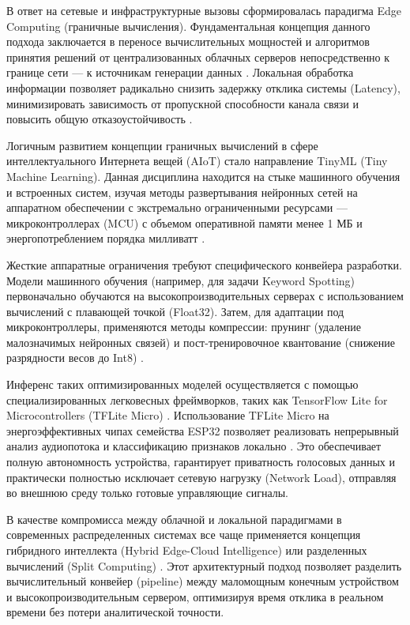 В ответ на сетевые и инфраструктурные вызовы сформировалась парадигма Edge Computing (граничные вычисления). Фундаментальная концепция данного подхода заключается в переносе вычислительных мощностей и алгоритмов принятия решений от централизованных облачных серверов непосредственно к границе сети — к источникам генерации данных \cite{Hazra2024}. Локальная обработка информации позволяет радикально снизить задержку отклика системы (Latency), минимизировать зависимость от пропускной способности канала связи и повысить общую отказоустойчивость \cite{Satyanarayanan2017}.

Логичным развитием концепции граничных вычислений в сфере интеллектуального Интернета вещей (AIoT) стало направление TinyML (Tiny Machine Learning). Данная дисциплина находится на стыке машинного обучения и встроенных систем, изучая методы развертывания нейронных сетей на аппаратном обеспечении с экстремально ограниченными ресурсами — микроконтроллерах (MCU) с объемом оперативной памяти менее 1 МБ и энергопотреблением порядка милливатт \cite{warden2019tinyml, Ray2022}. 

Жесткие аппаратные ограничения требуют специфического конвейера разработки. Модели машинного обучения (например, для задачи Keyword Spotting) первоначально обучаются на высокопроизводительных серверах с использованием вычислений с плавающей точкой (Float32). Затем, для адаптации под микроконтроллеры, применяются методы компрессии: прунинг (удаление малозначимых нейронных связей) и пост-тренировочное квантование (снижение разрядности весов до Int8) \cite{Ray2022}. 

Инференс таких оптимизированных моделей осуществляется с помощью специализированных легковесных фреймворков, таких как TensorFlow Lite for Microcontrollers (TFLite Micro) \cite{david2021tensorflow}. Использование TFLite Micro на энергоэффективных чипах семейства ESP32 позволяет реализовать непрерывный анализ аудиопотока и классификацию признаков локально \cite{tflite_micro_docs}. Это обеспечивает полную автономность устройства, гарантирует приватность голосовых данных и практически полностью исключает сетевую нагрузку (Network Load), отправляя во внешнюю среду только готовые управляющие сигналы.

В качестве компромисса между облачной и локальной парадигмами в современных распределенных системах все чаще применяется концепция гибридного интеллекта (Hybrid Edge-Cloud Intelligence) или разделенных вычислений (Split Computing) \cite{Srinivas2025}. Этот архитектурный подход позволяет разделить вычислительный конвейер (pipeline) между маломощным конечным устройством и высокопроизводительным сервером, оптимизируя время отклика в реальном времени без потери аналитической точности.

